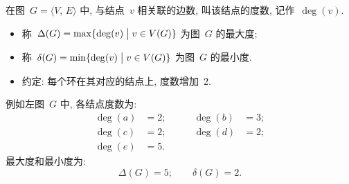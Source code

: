 \documentclass[serif,envcountsect]{beamer}
\begin{document}
\begin{frame}\frametitle{}
\begin{definition}
在图~$G=\langle V,\, E\rangle$ 中, 与结点~$v$ 相关联的边数, 叫该结点的\alert{度数}, 记作~$\deg (v)$. \pause
\begin{itemize}
    \item 称~$ \Delta (G) = \max \{ \deg (v)\bigm| v\in V(G) \}$ 为图~$G$ 的\alert{最大度}; \pause
    \item 称~$\delta  (G) = \min \{ \deg (v)\bigm| v\in V(G) \}$ 为图~$G$ 的\alert{最小度}. \pause
    \item 约定: 每个环在其对应的结点上, 度数增加~$2$.
\end{itemize}
\end{definition}\pause\small
\begin{minipage}[c]{5cm}
\begin{center}
\end{center}
\end{minipage}
\begin{minipage}[c]{6cm}
例如左图~$G$ 中, 各结点度数为:
\begin{align*}
   \deg (a)&=2;&\qquad \deg (b)&=3;\\
   \deg (c)&=2;&\qquad \deg (d)&=2;\\
   \deg (e)&=5.&&
\end{align*}\pause
最大度和最小度为:
    \[\Delta (G)=5; \qquad \delta  (G)=2.\]
\end{minipage}
\end{frame}
\end{document}
